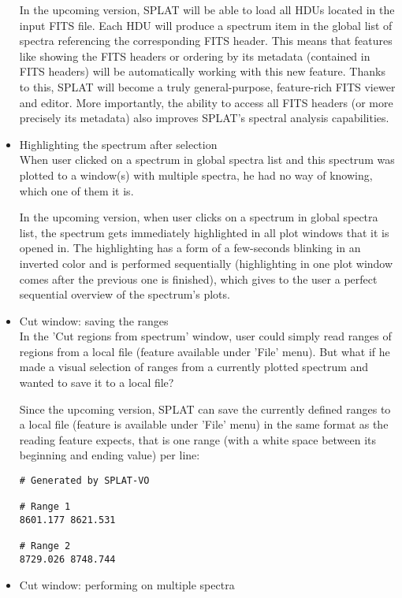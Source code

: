 \documentclass[final,authoryear,5p,times,twocolumn]{elsarticle}
\begin{document}
\begin{itemize}
In the upcoming version, SPLAT will be able to load all HDUs located in the input FITS file. Each HDU will produce a spectrum item in the global list of spectra referencing the corresponding FITS header. This means that features like showing the FITS headers or ordering by its metadata (contained in FITS headers) will be automatically working with this new feature. Thanks to this, SPLAT will become a truly general-purpose, feature-rich FITS viewer and editor. More importantly, the ability to access all FITS headers (or more precisely its metadata) also improves SPLAT's spectral analysis capabilities.

\item Highlighting the spectrum after selection\\

When user clicked on a spectrum in global spectra list and this spectrum was plotted to a window(s) with multiple spectra, he had no way of knowing, which one of them it is.

In the upcoming version, when user clicks on a spectrum in global spectra list, the spectrum gets immediately highlighted in all plot windows that it is opened in. The highlighting has a form of a few-seconds blinking in an inverted color and is performed sequentially (highlighting in one plot window comes after the previous one is finished), which gives to the user a perfect sequential overview of the spectrum's plots.

\item Cut window: saving the ranges\\

In the 'Cut regions from spectrum' window, user could simply read ranges of regions from a local file (feature available under 'File' menu). But what if he made a visual selection of ranges from a currently plotted spectrum and wanted to save it to a local file?

Since the upcoming version, SPLAT can save the currently defined ranges to a local file (feature is available under 'File' menu) in the same format as the reading feature expects, that is one range (with a white space between its beginning and ending value) per line:

\begin{verbatim}
# Generated by SPLAT-VO

# Range 1
8601.177 8621.531

# Range 2
8729.026 8748.744
\end{verbatim}

\item Cut window: performing on multiple spectra\\


\end{itemize}
\end{document}
